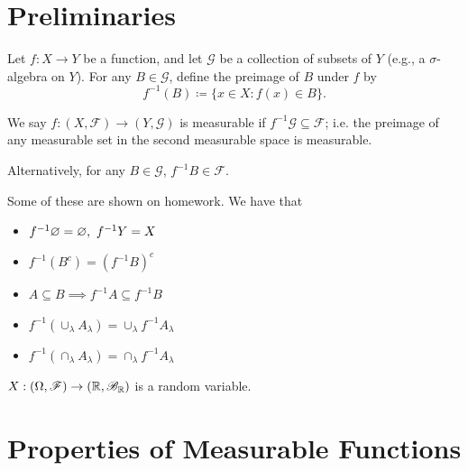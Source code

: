 
\section{Preliminaries}

\begin{definition}[Preimage]
	Let $f : X \to Y$ be a function, and let $\mathscr{G}$ be a collection of subsets of $Y$ (e.g., a $\sigma$-algebra on $Y$). 
	For any $B \in \mathscr{G}$, define the preimage of $B$ under $f$ by
	\[
		f^{-1}(B) \coloneqq \{x \in X: f(x) \in B\}.
	\]
\end{definition}

\begin{definition}
	We say $f: \left(X, \mathscr{F} \right) \to \left( Y , \mathscr{G} \right)$ is measurable if $f^{-1}\mathscr{G} \subseteq \mathscr{F}$; i.e. the preimage of any measurable set in the second measurable space is measurable.

	Alternatively, for any $B \in \mathscr{G}$, $f^{-1}B \in \mathscr{F}$.
\end{definition}

\begin{remark}
	Some of these are shown on homework. We have that
	\begin{itemize}
		\item $f^{-1}\varnothing = \varnothing,\ f^{-1}Y = X$
		\item $f^{-1}\left( B^{c} \right) = \left( f^{-1}B \right)^{c}$
		\item $A \subseteq B \implies f^{-1}A \subseteq f^{-1}B$
		\item $f^{-1}\left( \cup_{\lambda}A_\lambda \right) = \cup_\lambda f^{-1}A_\lambda$
		\item $f^{-1}\left( \cap_\lambda A_\lambda \right) = \cap_\lambda f^{-1} A_\lambda$
	\end{itemize}
\end{remark}


\begin{definition}
	$X: (\Omega, \mathscr{F}) \to \left( \mathbb{R}, \mathscr{B}_{\mathbb{R}} \right)$ is a random variable.
\end{definition}

\section{Properties of Measurable Functions}


